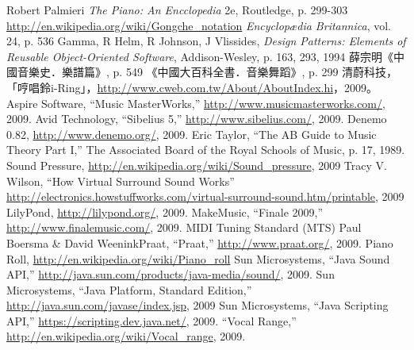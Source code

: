 \begin{thebibliography}{99} %
  Robert Palmieri
  \emph{The Piano: An Encclopedia}
  2e,
  Routledge,  
  p. 299-303
  \url{http://en.wikipedia.org/wiki/Gongche_notation}
  \emph{Encyclopædia Britannica}, vol. 24, p. 536
  Gamma, R Helm, R Johnson, J Vlissides, 
  \emph{Design Patterns: Elements of Reusable Object-Oriented Software},
  Addison-Wesley, p. 163, 293, 
  1994
  薛宗明《中國音樂史．樂譜篇》, p. 549
  《中國大百科全書．音樂舞蹈》, p. 299
   清蔚科技，「哼唱鈴i-Ring」，\url{http://www.cweb.com.tw/About/AboutIndex.hi}，2009。
   Aspire Software, “Music MasterWorks,” \url{http://www.musicmasterworks.com/}, 2009.
   Avid Technology, “Sibelius 5,” \url{http://www.sibelius.com/}, 2009.
   Denemo 0.82, \url{http://www.denemo.org/}, 2009.
   Eric Taylor, “The AB Guide to Music Theory Part I,” The Associated Board of the Royal Schools of Music, p. 17, 1989. 
   Sound Pressure, \url{http://en.wikipedia.org/wiki/Sound_pressure}, 2009
   Tracy V. Wilson, “How Virtual Surround Sound Works” \url{http://electronics.howstuffworks.com/virtual-surround-sound.htm/printable}, 2009
   LilyPond, \url{http://lilypond.org/}, 2009.
   MakeMusic, “Finale 2009,” \url{http://www.finalemusic.com/}, 2009.
   MIDI Tuning Standard (MTS) %
   Paul Boersma & David WeeninkPraat, “Praat,” \url{http://www.praat.org/}, 2009.
   Piano Roll, \url{http://en.wikipedia.org/wiki/Piano_roll}
   Sun Microsystems, “Java Sound API,” \url{http://java.sun.com/products/java-media/sound/}, 2009.
   Sun Microsystems, “Java Platform, Standard Edition,” \url{http://java.sun.com/javase/index.jsp}, 2009
   Sun Microsystems, “Java Scripting API,” \url{https://scripting.dev.java.net/}, 2009.
   “Vocal Range,” \url{http://en.wikipedia.org/wiki/Vocal_range}, 2009.
\end{thebibliography}


